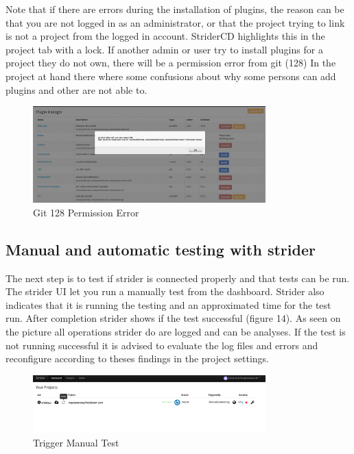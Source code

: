 Note that if there are errors during the installation of plugins, the reason can be that you are not logged in as an administrator,
or that the project trying to link is not a project from the logged in account. StriderCD highlights this in the project tab with a lock.
If another admin or user try to install plugins for a project they do not own, there will be a permission error from git (128)
In the project at hand there where some confusions about why some persons can add plugins and other are not able to.

\begin{figure}[h!]
  \centering
  \includegraphics[width=0.8\textwidth]{images/permissionError.png}
  \caption{Git 128 Permission Error}
\end{figure}

\subsection{Manual and automatic testing with strider}
\label{Manual And Automatic Testing With Strider}
The next step is to test if strider is connected properly and that tests can be run. The strider UI let you run a manually test from
the dashboard. Strider also indicates that it is running the testing and an approximated time for the test run. After completion
strider shows if the test successful (figure 14). As seen on the picture all operations strider do are logged and can be
analyses. If the test is not running successful it is advised to evaluate the log files and errors and reconfigure according to theses
findings in the project settings.

\begin{figure}[h!]
  \centering
  \includegraphics[width=0.8\textwidth]{images/manualTest.png}
  \caption{Trigger Manual Test}
\end{figure}

